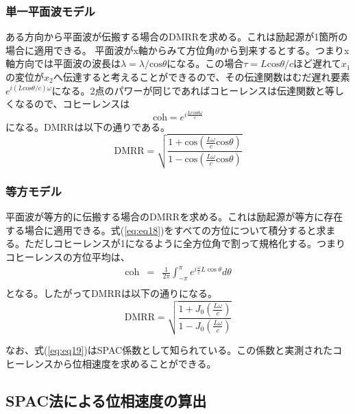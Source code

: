 \documentclass[a4paper,12pt]{jsarticle}
\begin{document}
\subsubsection{単一平面波モデル}
ある方向から平面波が伝搬する場合のDMRRを求める。これは励起源が1箇所の場合に適用できる。
平面波がx軸からみて方位角$\theta$から到来するとする。つまりx軸方向では平面波の波長は$\lambda=\lambda/\mathrm{cos}\theta$になる。この場合$\tau=L\mathrm{cos}\theta/c$ほど遅れて$x_1$の変位が$x_2$へ伝達すると考えることができるので、その伝達関数はむだ遅れ要素$e^{i(L\mathrm{cos}\theta/c)\omega}$になる。2点のパワーが同じであればコヒーレンスは伝達関数と等しくなるので、コヒーレンスは
\begin{equation}
  \mathrm{coh}=e^{i\frac{L\mathrm{cos}\theta\omega}{c}}
\end{equation}
になる。DMRRは以下の通りである。
\begin{equation}  \label{eq:eq18}
  \mathrm{DMRR} = \sqrt{\frac{1+\mathrm{cos}(\frac{L\omega}{c}\mathrm{cos}\theta)}{1-\mathrm{cos}(\frac{L\omega}{c}\mathrm{cos}\theta)}}
\end{equation}



\subsubsection{等方モデル}
平面波が等方的に伝搬する場合のDMRRを求める。これは励起源が等方に存在する場合に適用できる。式(\ref{eq:eq18})をすべての方位について積分すると求まる。ただしコヒーレンスが1になるように全方位角で割って規格化する。つまりコヒーレンスの方位平均は、
\begin{eqnarray} \label{eq:eq19}
  \mathrm{coh} &=& \frac{1}{2\pi} \int_{-\pi}^{\pi} e^{i\frac{\omega}{c} L\cos \theta} d \theta \\
\end{eqnarray}
となる。したがってDMRRは以下の通りになる。
\begin{equation}  \label{eq:eq20}
  \mathrm{DMRR} = \sqrt{\frac{1+J_0(\frac{L\omega}{c})}{1-J_0(\frac{L\omega}{c})}}
\end{equation}

なお、式(\ref{eq:eq19})はSPAC係数として知られている。この係数と実測されたコヒーレンスから位相速度を求めることができる。

\subsection{SPAC法による位相速度の算出}
\end{document}
